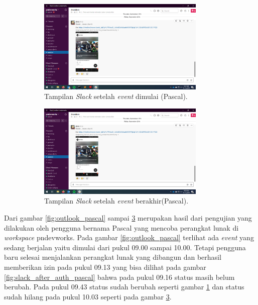 \begin{figure}[h]
\begin{subfigure}{8.5cm}
  \centering
  \includegraphics[width=8cm]{./Gambar/PengujianPaPascal/Slack_After.png}
  \caption{Tampilan \textit{Slack} setelah \textit{event} dimulai (Pascal).}
  \label{fig:slack_after_pascal}
\end{subfigure}
\begin{subfigure}{8.5cm}
  \centering
  \includegraphics[width=8cm]{./Gambar/PengujianPaPascal/Slack_After_Event_End.png}
  \caption{Tampilan \textit{Slack} setelah \textit{event} berakhir(Pascal).}
  \label{fig:slack_after_event_end_pascal}
\end{subfigure}
\caption{}
\end{figure}

Dari gambar \ref{fig:outlook_pascal} sampai \ref{fig:slack_after_event_end_pascal} merupakan hasil dari pengujian yang dilakukan oleh pengguna bernama Pascal yang mencoba perangkat lunak di \textit{workspace} pndevworks. Pada gambar \ref{fig:outlook_pascal} terlihat ada \textit{event} yang sedang berjalan yaitu dimulai dari pukul 09.00 sampai 10.00. Tetapi pengguna baru selesai menjalankan perangkat lunak yang dibangun dan berhasil memberikan izin pada pukul 09.13 yang bisa dilihat pada gambar \ref{fig:slack_after_auth_pascal} bahwa pada pukul 09.16 status masih belum berubah. Pada pukul 09.43 status sudah berubah seperti gambar \ref{fig:slack_after_pascal} dan status sudah hilang pada pukul 10.03 seperti pada gambar \ref{fig:slack_after_event_end_pascal}.  

